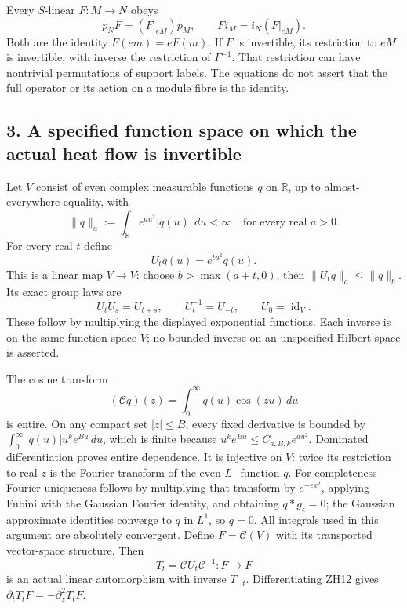 \documentclass[
  10pt,
  a4paper,
]{article}
\begin{document}
Every \(S\)-linear \(F:M\to N\) obeys \[
p_NF=(F|_{eM})p_M,\qquad
Fi_M=i_N(F|_{eM}).
\tag{ZH8}
\] Both are the identity \(F(em)=eF(m)\). If \(F\) is invertible, its
restriction to \(eM\) is invertible, with inverse the restriction of
\(F^{-1}\). That restriction can have nontrivial permutations of support
labels. The equations do not assert that the full operator or its action
on a module fibre is the identity.

\subsection{3. A specified function space on which the actual heat flow
is
invertible}\label{a-specified-function-space-on-which-the-actual-heat-flow-is-invertible}

Let \(V\) consist of even complex measurable functions \(q\) on
\(\mathbb R\), up to almost-everywhere equality, with \[
\|q\|_a:=\int_{\mathbb R}e^{a u^2}|q(u)|\,du<\infty
\quad\text{for every real }a>0.
\tag{ZH9}
\] For every real \(t\) define \[
U_tq(u)=e^{tu^2}q(u).
\tag{ZH10}
\] This is a linear map \(V\to V\): choose \(b>\max(a+t,0)\), then
\(\|U_tq\|_a\le\|q\|_b\). Its exact group laws are \[
U_tU_s=U_{t+s},\qquad U_t^{-1}=U_{-t},\qquad U_0=\operatorname{id}_V.
\tag{ZH11}
\] These follow by multiplying the displayed exponential functions. Each
inverse is on the same function space \(V\); no bounded inverse on an
unspecified Hilbert space is asserted.

The cosine transform \[
(\mathcal Cq)(z)=\int_0^\infty q(u)\cos(zu)\,du
\tag{ZH12}
\] is entire. On any compact set \(|z|\le B\), every fixed derivative is
bounded by \(\int_0^\infty |q(u)|u^k e^{Bu}\,du\), which is finite
because \(u^k e^{Bu}\le C_{a,B,k}e^{au^2}\). Dominated differentiation
proves entire dependence. It is injective on \(V\): twice its
restriction to real \(z\) is the Fourier transform of the even \(L^1\)
function \(q\). For completeness Fourier uniqueness follows by
multiplying that transform by \(e^{-\epsilon x^2}\), applying Fubini
with the Gaussian Fourier identity, and obtaining \(q*g_\epsilon=0\);
the Gaussian approximate identities converge to \(q\) in \(L^1\), so
\(q=0\). All integrals used in this argument are absolutely convergent.
Define \(F=\mathcal C(V)\) with its transported vector-space structure.
Then \[
T_t=\mathcal C U_t\mathcal C^{-1}:F\to F
\tag{ZH13}
\] is an actual linear automorphism with inverse \(T_{-t}\).
Differentiating ZH12 gives \(\partial_tT_tF=-\partial_z^2T_tF\).
\end{document}
